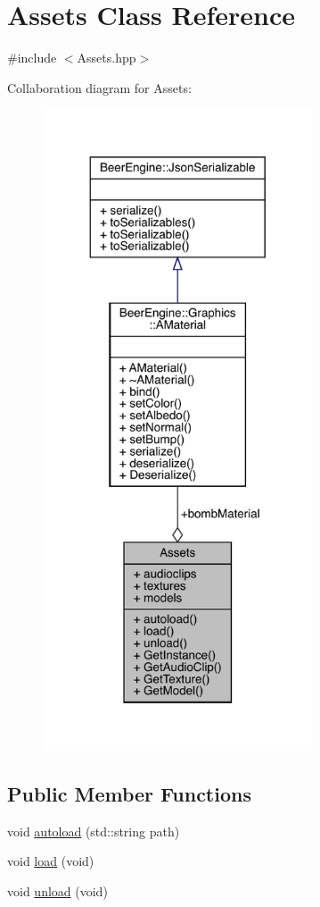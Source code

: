 \hypertarget{class_assets}{}\section{Assets Class Reference}
\label{class_assets}


{\ttfamily \#include $<$Assets.\+hpp$>$}



Collaboration diagram for Assets\+:
\nopagebreak
\begin{figure}[H]
\begin{center}
\leavevmode
\includegraphics[width=227pt]{class_assets__coll__graph}
\end{center}
\end{figure}
\subsection*{Public Member Functions}
\begin{DoxyCompactItemize}
\item 
void \mbox{\hyperlink{class_assets_a4e848364b8e24434ec5be20c28106dbd}{autoload}} (std\+::string path)
\item 
void \mbox{\hyperlink{class_assets_a39f25e7a1853ac52ca5fcfdb676ace04}{load}} (void)
\item 
void \mbox{\hyperlink{class_assets_a7c382091adff219150cbd067d646fe16}{unload}} (void)
\end{DoxyCompactItemize}
